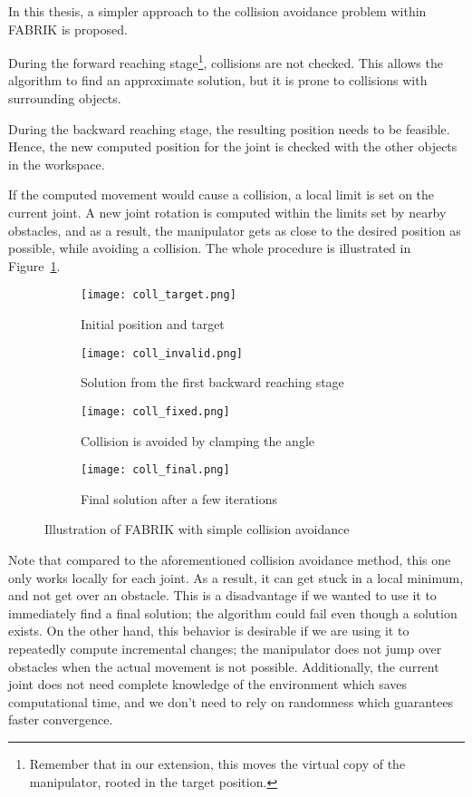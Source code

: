 In this thesis, a simpler approach to the collision avoidance problem within FABRIK is proposed.


During the forward reaching stage\footnote{Remember that in our extension, this moves the virtual copy of the manipulator, rooted in the target position.}, collisions are not checked. This allows the algorithm to find an approximate solution, but it is prone to collisions with surrounding objects.


During the backward reaching stage, the resulting position needs to be feasible. Hence, the new computed position for the joint is checked with the other objects in the workspace.

If the computed movement would cause a collision, a local limit is set on the current joint. A new joint rotation is computed within the limits set by nearby obstacles, and as a result, the manipulator gets as close to the desired position as possible, while avoiding a collision. The whole procedure is illustrated in Figure~\ref{fig:coll}.

\begin{figure}
    \centering
    \begin{subfigure}[t]{.24\textwidth}
      \texttt{[image: coll\_target.png]}
      \caption{Initial position and target}
    \end{subfigure}
    \begin{subfigure}[t]{0.24\textwidth}
      \texttt{[image: coll\_invalid.png]}
      \caption{Solution from the first backward reaching stage}
    \end{subfigure}
    \begin{subfigure}[t]{.24\textwidth}
      \texttt{[image: coll\_fixed.png]}
      \caption{Collision is avoided by clamping the angle}
    \end{subfigure}
    \begin{subfigure}[t]{.24\textwidth}
      \texttt{[image: coll\_final.png]}
      \caption{Final solution after a few iterations}
    \end{subfigure}
    \caption{Illustration of FABRIK with simple collision avoidance}\label{fig:coll}
\end{figure}
  
Note that compared to the aforementioned collision avoidance method, this one only works locally for each joint. As a result, it can get stuck in a local minimum, and not get over an obstacle. This is a disadvantage if we wanted to use it to immediately find a final solution; the algorithm could fail even though a solution exists. On the other hand, this behavior is desirable if we are using it to repeatedly compute incremental changes; the manipulator does not jump over obstacles when the actual movement is not possible. Additionally, the current joint does not need complete knowledge of the environment which saves computational time, and we don't need to rely on randomness which guarantees faster convergence.

